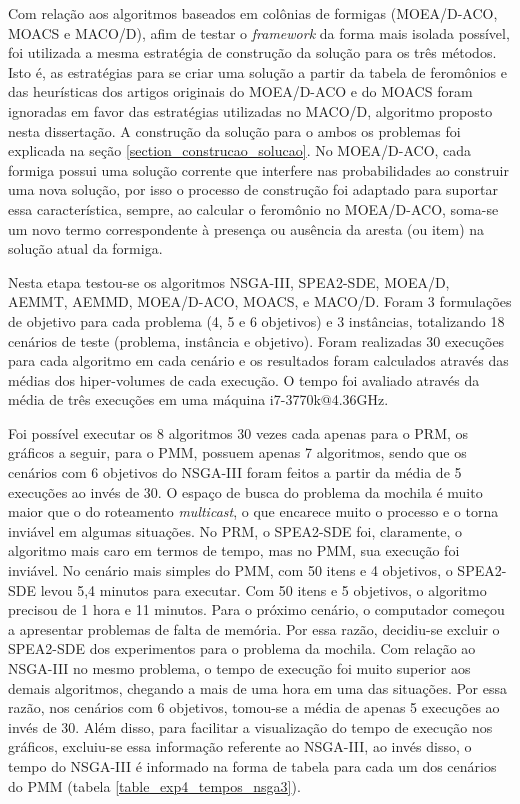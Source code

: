 Com relação aos algoritmos baseados em colônias de formigas (MOEA/D-ACO, MOACS e MACO/D), afim de testar o \textit{framework} da forma mais isolada possível, foi utilizada a mesma estratégia de construção da solução para os três métodos. Isto é, as estratégias para se criar uma solução a partir da tabela de feromônios e das heurísticas dos artigos originais do MOEA/D-ACO e do MOACS foram ignoradas em favor das estratégias utilizadas no MACO/D, algoritmo proposto nesta dissertação. A construção da solução para o ambos os problemas foi explicada na seção \ref{section_construcao_solucao}. No MOEA/D-ACO, cada formiga possui uma solução corrente que interfere nas probabilidades ao construir uma nova solução, por isso o processo de construção foi adaptado para suportar essa característica, sempre, ao calcular o feromônio no MOEA/D-ACO, soma-se um novo termo correspondente à presença ou ausência da aresta (ou item) na solução atual da formiga.

Nesta etapa testou-se os algoritmos NSGA-III, SPEA2-SDE, MOEA/D, AEMMT, AEMMD, MOEA/D-ACO, MOACS, e MACO/D. Foram 3 formulações de objetivo para cada problema (4, 5 e 6 objetivos) e 3 instâncias, totalizando 18 cenários de teste (problema, instância e objetivo). Foram realizadas 30 execuções para cada algoritmo em cada cenário e os resultados foram calculados através das médias dos hiper-volumes de cada execução. O tempo foi avaliado através da média de três execuções em uma máquina i7-3770k@4.36GHz.

Foi possível executar os 8 algoritmos 30 vezes cada apenas para o PRM, os gráficos a seguir, para o PMM, possuem apenas 7 algoritmos, sendo que os cenários com 6 objetivos do NSGA-III foram feitos a partir da média de 5 execuções ao invés de 30. O espaço de busca do problema da mochila é muito maior que o do roteamento \textit{multicast}, o que encarece muito o processo e o torna inviável em algumas situações. No PRM, o SPEA2-SDE foi, claramente, o algoritmo mais caro em termos de tempo, mas no PMM, sua execução foi inviável. No cenário mais simples do PMM, com 50 itens e 4 objetivos, o SPEA2-SDE levou 5,4 minutos para executar. Com 50 itens e 5 objetivos, o algoritmo precisou de 1 hora e 11 minutos. Para o próximo cenário, o computador começou a apresentar problemas de falta de memória. Por essa razão, decidiu-se excluir o SPEA2-SDE dos experimentos para o problema da mochila. Com relação ao NSGA-III no mesmo problema, o tempo de execução foi muito superior aos demais algoritmos, chegando a mais de uma hora em uma das situações. Por essa razão, nos cenários com 6 objetivos, tomou-se a média de apenas 5 execuções ao invés de 30. Além disso, para facilitar a visualização do tempo de execução nos gráficos, excluiu-se essa informação referente ao NSGA-III, ao invés disso, o tempo do NSGA-III é informado na forma de tabela para cada um dos cenários do PMM (tabela \ref{table_exp4_tempos_nsga3}).

